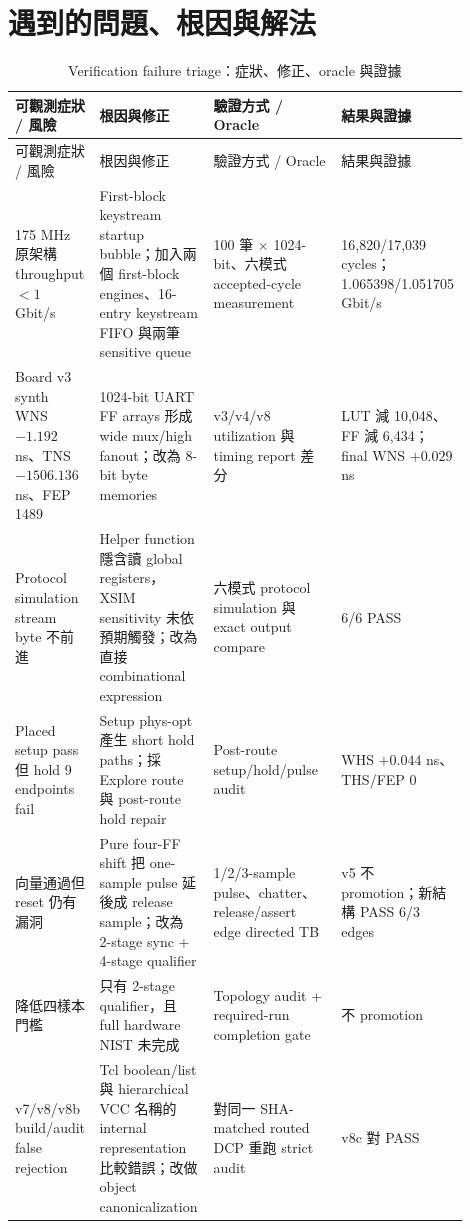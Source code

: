 \documentclass[UTF8,fontset=none,11pt,a4paper]{ctexrep}
\newcommand{\code}[1]{\texttt{\detokenize{#1}}}
\begin{document}
\chapter{遇到的問題、根因與解法}

\begingroup
\footnotesize
\setlength{\tabcolsep}{3pt}
\begin{longtable}{@{}p{0.16\linewidth}p{0.25\linewidth}p{0.29\linewidth}p{0.20\linewidth}@{}}
\caption{Verification failure triage：症狀、修正、oracle 與證據}\label{tab:issues}\\
\toprule
可觀測症狀 / 風險 & 根因與修正 & 驗證方式 / Oracle & 結果與證據 \\
\midrule
\endfirsthead
\toprule
可觀測症狀 / 風險 & 根因與修正 & 驗證方式 / Oracle & 結果與證據 \\
\midrule
\endhead
175 MHz 原架構 throughput $<1$ Gbit/s & First-block keystream startup bubble；加入兩個 first-block engines、16-entry keystream FIFO 與兩筆 sensitive queue & 100 筆 $\times$ 1024-bit、六模式 accepted-cycle measurement & 16,820/17,039 cycles；1.065398/1.051705 Gbit/s \\
\addlinespace
Board v3 synth WNS $-1.192$ ns、TNS $-1506.136$ ns、FEP 1489 & 1024-bit UART FF arrays 形成 wide mux/high fanout；改為 8-bit byte memories & v3/v4/v8 utilization 與 timing report 差分 & LUT 減 10,048、FF 減 6,434；final WNS $+0.029$ ns \\
\addlinespace
Protocol simulation stream byte 不前進 & Helper function 隱含讀 global registers，XSIM sensitivity 未依預期觸發；改為直接 combinational expression & 六模式 protocol simulation 與 exact output compare & 6/6 PASS \\
\addlinespace
Placed setup pass 但 hold 9 endpoints fail & Setup phys-opt 產生 short hold paths；採 Explore route 與 post-route hold repair & Post-route setup/hold/pulse audit & WHS $+0.044$ ns、THS/FEP 0 \\
\addlinespace
\code{cdc_final_v5} 向量通過但 reset 仍有漏洞 & Pure four-FF shift 把 one-sample pulse 延後成 release sample；改為 2-stage sync + 4-stage qualifier & 1/2/3-sample pulse、chatter、release/assert edge directed TB & v5 不 promotion；新結構 PASS 6/3 edges \\
\addlinespace
\code{resetqual_final_v6} 降低四樣本門檻 & 只有 2-stage qualifier，且 full hardware NIST 未完成 & Topology audit + required-run completion gate & 不 promotion \\
\addlinespace
v7/v8/v8b build/audit false rejection & Tcl boolean/list 與 hierarchical VCC 名稱的 internal representation 比較錯誤；改做 object canonicalization & 對同一 SHA-matched routed DCP 重跑 strict audit & v8c 對 \code{A917...016B} PASS \\

\end{longtable}
\end{document}
